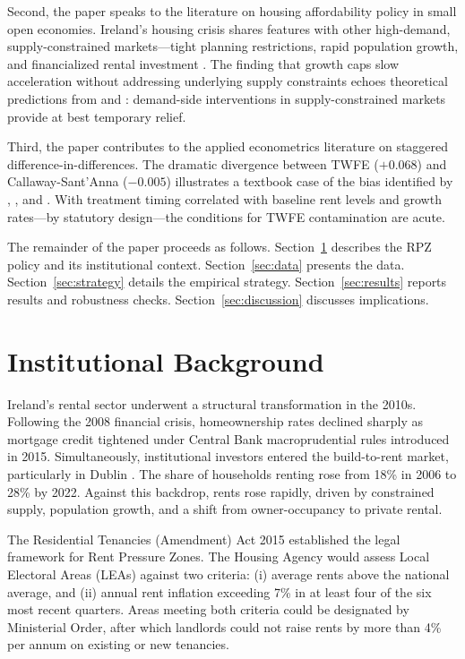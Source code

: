 \documentclass[12pt]{article}
\begin{document}
Second, the paper speaks to the literature on housing affordability policy in small open economies. Ireland's housing crisis shares features with other high-demand, supply-constrained markets---tight planning restrictions, rapid population growth, and financialized rental investment \citep{norris2016,byrne2020}. The finding that growth caps slow acceleration without addressing underlying supply constraints echoes theoretical predictions from \citet{glaeser2003} and \citet{gyourko2008}: demand-side interventions in supply-constrained markets provide at best temporary relief.

Third, the paper contributes to the applied econometrics literature on staggered difference-in-differences. The dramatic divergence between TWFE ($+0.068$) and Callaway-Sant'Anna ($-0.005$) illustrates a textbook case of the bias identified by \citet{goodman-bacon2021}, \citet{callaway2021}, and \citet{sun2021}. With treatment timing correlated with baseline rent levels and growth rates---by statutory design---the conditions for TWFE contamination are acute.

The remainder of the paper proceeds as follows. Section~\ref{sec:background} describes the RPZ policy and its institutional context. Section~\ref{sec:data} presents the data. Section~\ref{sec:strategy} details the empirical strategy. Section~\ref{sec:results} reports results and robustness checks. Section~\ref{sec:discussion} discusses implications.


\section{Institutional Background}
\label{sec:background}

Ireland's rental sector underwent a structural transformation in the 2010s. Following the 2008 financial crisis, homeownership rates declined sharply as mortgage credit tightened under Central Bank macroprudential rules introduced in 2015. Simultaneously, institutional investors entered the build-to-rent market, particularly in Dublin \citep{byrne2020}. The share of households renting rose from 18\% in 2006 to 28\% by 2022. Against this backdrop, rents rose rapidly, driven by constrained supply, population growth, and a shift from owner-occupancy to private rental.

The Residential Tenancies (Amendment) Act 2015 established the legal framework for Rent Pressure Zones. The Housing Agency would assess Local Electoral Areas (LEAs) against two criteria: (i) average rents above the national average, and (ii) annual rent inflation exceeding 7\% in at least four of the six most recent quarters. Areas meeting both criteria could be designated by Ministerial Order, after which landlords could not raise rents by more than 4\% per annum on existing or new tenancies.
\end{document}
